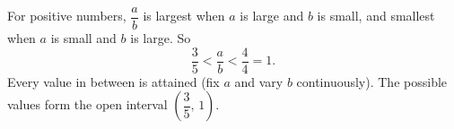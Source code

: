 For positive numbers, $\dfrac {a}{b}$ is largest when $a$ is large and $b$ is small, and smallest when $a$ is small and $b$ is large. So
\[
\dfrac{3}{5}<\dfrac {a}{b}<\dfrac{4}{4}=1 .
\]
Every value in between is attained (fix $a$ and vary $b$ continuously). The possible values form the open interval $\boxed{\left(\dfrac{3}{5},\,1\right)}$.
